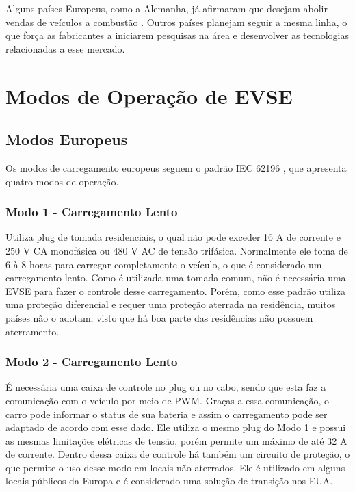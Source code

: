     Alguns países Europeus, como a Alemanha, já afirmaram que desejam abolir vendas de veículos a combustão \cite{forbes-news-germany}. Outros países planejam seguir a mesma linha, o que força as fabricantes a iniciarem pesquisas na área e desenvolver as tecnologias relacionadas a esse mercado.

  \section{Modos de Operação de \ac{EVSE}}
  \label{stateofart:modes}

    \subsection{Modos Europeus}
    \label{stateofart:modes:europe}

      Os modos de carregamento europeus seguem o padrão IEC 62196 \cite{iec-62196}, que apresenta quatro modos de operação.

        \subsubsection{Modo 1 - Carregamento Lento}
        \label{stateofart:modes:europe:mode1}

        Utiliza plug de tomada residenciais, o qual não pode exceder 16 A de corrente e 250 V \ac{CA} monofásica ou 480 V AC de tensão trifásica. Normalmente ele toma de 6 à 8 horas para carregar completamente o veículo, o que é considerado um carregamento lento. Como é utilizada uma tomada comum, não é necessária uma \ac{EVSE} para fazer o controle desse carregamento. Porém, como esse padrão utiliza uma proteção diferencial e requer uma proteção aterrada na residência, muitos países não o adotam, visto que há boa parte das residências não possuem aterramento.

        \subsubsection{Modo 2 - Carregamento Lento}
        \label{stateofart:modes:europe:mode2}

        É necessária uma caixa de controle no plug ou no cabo, sendo que esta faz a comunicação com o veículo por meio de \ac{PWM}. Graças a essa comunicação, o carro pode informar o status de sua bateria e assim o carregamento pode ser adaptado de acordo com esse dado. Ele utiliza o mesmo plug do Modo 1 e possui as mesmas limitações elétricas de tensão, porém permite um máximo de até 32 A de corrente. Dentro dessa caixa de controle há também um circuito de proteção, o que permite o uso desse modo em locais não aterrados. Ele é utilizado em alguns locais públicos da Europa e é considerado uma solução de transição nos EUA.


